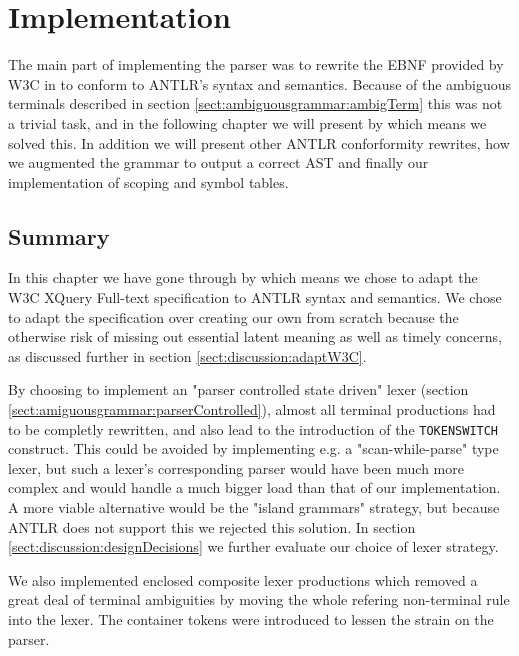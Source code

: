 \chapter{Implementation}
\label{chapter:implementation}

The main part of implementing the parser was to rewrite the EBNF provided by W3C in \cite{w3c01} to conform to ANTLR's syntax and semantics. Because of the ambiguous terminals described in section \ref{sect:ambiguousgrammar:ambigTerm} this was not a trivial task, and in the following chapter we will present by which means we solved this. In addition we will present other ANTLR conforformity rewrites, how we augmented the grammar to output a correct AST and finally our implementation of scoping and symbol tables.














\section{Summary}
In this chapter we have gone through by which means we chose to adapt the W3C
XQuery Full-text specification to ANTLR syntax and semantics. We chose to adapt
the specification over creating our own from scratch because the otherwise risk
of missing out essential latent meaning as well as timely concerns, as
discussed further in section \ref{sect:discussion:adaptW3C}.    

By choosing to implement an "parser controlled state driven" lexer (section
\ref{sect:amiguousgrammar:parserControlled}), almost all terminal productions
had to be completly rewritten, and also lead to the introduction of the
\verb!TOKENSWITCH! construct. This could be avoided by implementing e.g. a
"scan-while-parse" type lexer, but such a lexer's corresponding parser would
have been much more complex and would handle a much bigger load than that of
our implementation. A more viable alternative would be the "island grammars"
strategy, but because ANTLR does not support this we rejected this solution. In
section \ref{sect:discussion:designDecisions} we further evaluate our choice of
lexer strategy.         

We also implemented enclosed composite lexer productions which removed a great
deal of terminal ambiguities by moving the whole refering non-terminal rule
into the lexer. The container tokens were introduced to lessen the strain on
the parser.   

